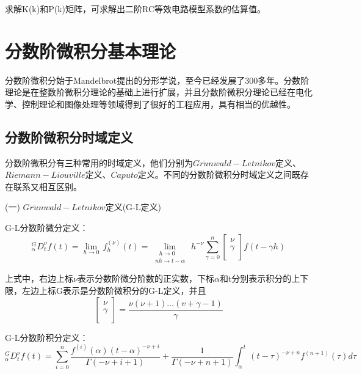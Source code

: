  求解K(k)和P(k)矩阵，可求解出二阶RC等效电路模型系数的估算值。
\section{分数阶微积分基本理论}
分数阶微积分始于Mandelbrot提出的分形学说，至今已经发展了300多年。分数阶理论是在整数阶微积分理论的基础上进行扩展，并且分数阶微积分理论已经在电化学、控制理论和图像处理等领域得到了很好的工程应用，具有相当的优越性。
\subsection{分数阶微积分时域定义}
分数阶微积分有三种常用的时域定义，他们分别为$Gr\ddot{u}nwald-Letnikov$定义、$Riemann-Liouville$定义、$Caputo$定义。不同的分数阶微积分时域定义之间既存在联系又相互区别。

(一) $Gr\ddot{u}nwald-Letnikov$定义(G-L定义)

G-L分数阶微分定义：
\begin{equation}
{}_{\alpha }^{G}D_{t}^{\nu }f(t)=\underset{h\to 0}{\mathop{\lim }}\,f_{h}^{(\nu )}\left( t \right)=\underset{\begin{smallmatrix} 
 ~~~h\to 0 \\ 
 nh\to t-\alpha  
\end{smallmatrix}}{\mathop{\lim }}\,{{h}^{-\nu }}\sum\limits_{\gamma =0}^{n}{\left[ \begin{matrix}
   \nu   \\
   \gamma   \\
\end{matrix} \right]}f\left( t-\gamma h \right)
\end{equation}

上式中，右边上标$\nu $表示分数阶微分阶数的正实数，下标$\alpha $和t分别表示积分的上下限，左边上标G表示是分数阶微积分的G-L定义，并且
\begin{equation}
\left[ \begin{matrix}
   \nu   \\
   \gamma   \\
\end{matrix} \right]=\frac{\nu \left( \nu +1 \right)\ldots \left( v+\gamma -1 \right)}{\gamma }
\end{equation}

G-L分数阶积分定义：
\begin{equation}
{}_{\alpha }^{G}D_{t}^{\nu }f(t)=\sum\limits_{i=0}^{n}{\frac{{{f}^{\left( i \right)}}\left( \alpha  \right){{\left( t-\alpha  \right)}^{-\nu +i}}}{\Gamma \left( -\nu +i+1 \right)}+\frac{1}{\Gamma \left( -\nu +n+1 \right)}}\int_{\alpha }^{t}{{{\left( t-\tau  \right)}^{-\nu +n}}{{f}^{\left( n+1 \right)}}\left( \tau  \right)}d\tau 
\end{equation}

